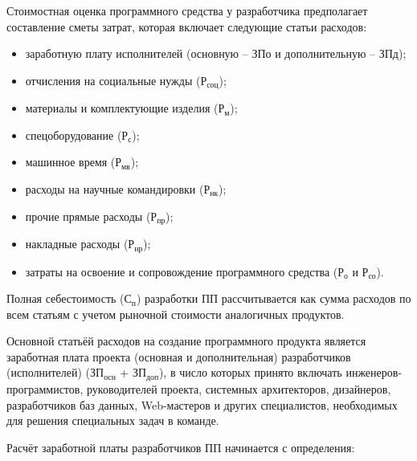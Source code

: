{\gostFont
    
    \par \redline Стоимостная оценка программного средства у разработчика предполагает составление сметы затрат, которая включает следующие статьи расходов:
    
    \begin{itemize}[leftmargin=2.15cm, labelwidth=0.65cm, labelsep=0.0cm]
        \item[•~] заработную плату исполнителей (основную {--} ЗПо и дополнительную {--} ЗПд);
        \item[•~] отчисления на социальные нужды ($\textrm{Р}_{\textrm{соц}}$);
        \item[•~] материалы и комплектующие изделия ($\textrm{Р}_{\textrm{м}}$);
        \item[•~] спецоборудование ($\textrm{Р}_{\textrm{с}}$);
        \item[•~] машинное время ($\textrm{Р}_{\textrm{мв}}$);
        \item[•~] расходы на научные командировки ($\textrm{Р}_{\textrm{нк}}$);
        \item[•~] прочие прямые расходы ($\textrm{Р}_{\textrm{пр}}$);
        \item[•~] накладные расходы ($\textrm{Р}_{\textrm{нр}}$);
        \item[•~] затраты на освоение и сопровождение программного средства ($\textrm{Р}_{\textrm{о}}$ и $\textrm{Р}_{\textrm{со}}$).
    \end{itemize}
    
    \par \redline Полная себестоимость ($\textrm{С}_{\textrm{п}}$) разработки ПП рассчитывается как сумма расходов по всем статьям с учетом рыночной стоимости аналогичных продуктов.
    
    \par \redline Основной статьёй расходов на создание программного продукта является заработная плата проекта (основная и дополнительная) разработчиков (исполнителей) ($\textrm{ЗП}_{\textrm{осн}}$ + $\textrm{ЗП}_{\textrm{доп}}$), в число которых принято включать инженеров-программистов, руководителей проекта, системных архитекторов, дизайнеров, разработчиков баз данных, Web-мастеров и других специалистов, необходимых для решения специальных задач в команде.
     
    \par \redline Расчёт заработной платы разработчиков ПП начинается с определения:
    
}
